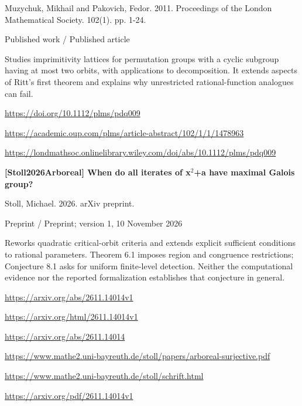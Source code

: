 \documentclass[11pt,a4paper,oneside,openany]{book}
\begin{document}
\color{black} Muzychuk, Mikhail and Pakovich, Fedor. 2011. Proceedings of the London Mathematical Society. 102(1). pp. 1-24.\par
{\small\sffamily\color{atlasgold}Published work / Published article}\par
\color{black} Studies imprimitivity lattices for permutation groups with a cyclic subgroup having at most two orbits, with applications to decomposition. It extends aspects of Ritt's first theorem and explains why unrestricted rational-function analogues can fail.\par
{\footnotesize\url{https://doi.org/10.1112/plms/pdq009}}\par
{\footnotesize\url{https://academic.oup.com/plms/article-abstract/102/1/1/1478963}}\par
{\footnotesize\url{https://londmathsoc.onlinelibrary.wiley.com/doi/abs/10.1112/plms/pdq009}}\par
\vspace{9pt}
\hypertarget{ref:Stoll2026Arboreal}{}
{\sffamily\bfseries\color{atlasgreen}[Stoll2026Arboreal] When do all iterates of x\ensuremath{{}^2}+a have maximal Galois group?}\par
\color{black} Stoll, Michael. 2026. arXiv preprint.\par
{\small\sffamily\color{atlasgold}Preprint / Preprint; version 1, 10 November 2026}\par
\color{black} Reworks quadratic critical-orbit criteria and extends explicit sufficient conditions to rational parameters. Theorem 6.1 imposes region and congruence restrictions; Conjecture 8.1 asks for uniform finite-level detection. Neither the computational evidence nor the reported formalization establishes that conjecture in general.\par
{\footnotesize\url{https://arxiv.org/abs/2611.14014v1}}\par
{\footnotesize\url{https://arxiv.org/html/2611.14014v1}}\par
{\footnotesize\url{https://arxiv.org/abs/2611.14014}}\par
{\footnotesize\url{https://www.mathe2.uni-bayreuth.de/stoll/papers/arboreal-surjective.pdf}}\par
{\footnotesize\url{https://www.mathe2.uni-bayreuth.de/stoll/schrift.html}}\par
{\footnotesize\url{https://arxiv.org/pdf/2611.14014v1}}\par
\vspace{9pt}
\hypertarget{ref:BenedettoGhiocaJuulTucker2025Periodic}{}
\end{document}
